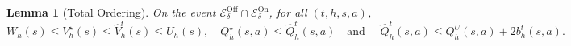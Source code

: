 \documentclass[twoside]{article}
\newtheorem{lemma}{Lemma}
\newcommand{\lowv}{W} %
\newcommand{\highv}{U} %
\begin{document}

\begin{lemma}[Total Ordering]
\label{lemma:total_ordering}
On the event $\mathcal{E}^{\mathrm{Off}}_\delta\cap \mathcal{E}^{\mathrm{On}}_\delta$, for all $(t,h,s,a)$,
\[
\lowv_{h}(s) \le V_h^\star(s) \le \widehat{V}_h^t(s) \le \highv_{h}(s),
\quad
Q_h^\star(s,a) \le \widehat{Q}_h^t(s,a)
 \quad \text{and } \quad
\widehat{Q}_h^t(s,a) \le Q_h^{\highv}(s,a)+2b_h^{t}(s,a).
\]
\end{lemma}
\end{document}
